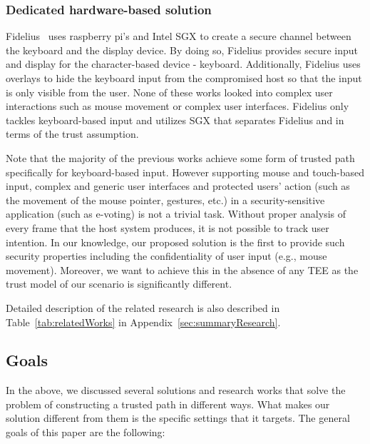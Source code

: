 \subsubsection{Dedicated hardware-based solution}  Fidelius~\cite{Fidelius} uses raspberry pi's and Intel SGX to create a secure channel between the keyboard and the display device. By doing so, Fidelius provides secure input and display for the character-based device - keyboard. Additionally, Fidelius uses overlays to hide the keyboard input from the compromised host so that the input is only visible from the user. 
None of these works looked into complex user interactions such as mouse movement or complex user interfaces. Fidelius only tackles keyboard-based input and utilizes SGX that separates Fidelius and \name in terms of the trust assumption.  


Note that the majority of the previous works achieve some form of trusted path specifically for keyboard-based input. However supporting mouse and touch-based input, complex and generic user interfaces and protected users' action (such as the movement of the mouse pointer, gestures, etc.) in a security-sensitive application (such as e-voting) is not a trivial task. Without proper analysis of every frame that the host system produces, it is not possible to track user intention. In our knowledge, our proposed solution is the first to provide such security properties including the confidentiality of user input (e.g., mouse movement). Moreover, we want to achieve this in the absence of any TEE as the trust model of our scenario is significantly different.

Detailed description of the related research is also described in Table~\ref{tab:relatedWorks} in Appendix~\ref{sec:summaryResearch}.

\subsection{Goals}
\label{sec:problemStatement:goals}

In the above, we discussed several solutions and research works that solve the problem of constructing a trusted path in different ways. What makes our solution different from them is the specific settings that it targets. 
The general goals of this paper are the following:

